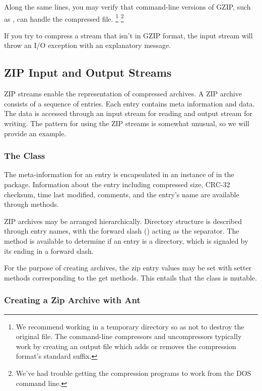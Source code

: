 Along the same lines, you may verify that command-line versions of
GZIP, such as , can handle the compressed file.%
%
\footnote{We recommend working in a temporary directory so as not to
  destroy the original  file.  The command-line
  compressors and uncompressors typically work by creating an output
  file which adds or removes the compression format's standard
  suffix.}%
\footnote{We've had trouble getting the compression programs to work from the
  DOS command line.}
%

If you try to compress a stream that isn't in GZIP format, the input
stream will throw an I/O exception with an explanatory message.


\subsection{ZIP Input and Output Streams}

ZIP streams enable the representation of compressed archives.  A ZIP
archive consists of a sequence of entries.  Each entry contains meta
information and data.  The data is accessed through an input stream
for reading and output stream for writing.  The pattern for using
the ZIP streams is somewhat unusual, so we will provide an example.

\subsubsection{The  Class}

The meta-information for an entry is encapsulated in an instance of
 in the  package.  Information
about the entry including compressed size, CRC-32 checksum, time last
modified, comments, and the entry's name are available through
methods.

ZIP archives may be arranged hierarchically.  Directory structure is
described through entry names, with the forward slash (\code{/})
acting as the separator.  The method  is available
to determine if an entry is a directory, which is signaled by its
ending in a forward slash.

For the purpose of creating archives, the zip entry values may
be set with setter methods corresponding to the get methods.  This
entails that the  class is mutable.

\subsubsection{Creating a Zip Archive with Ant}

